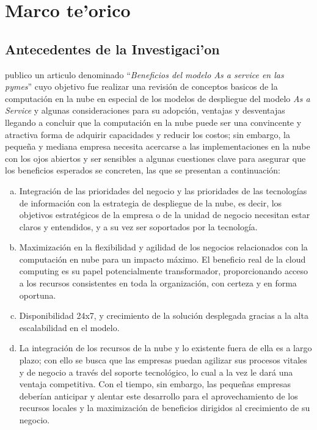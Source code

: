 %
%

\chapter{Marco te'orico}

\section{Antecedentes de la Investigaci'on}
\cite{jrodriguez} publico un articulo denominado ``\emph{Beneficios del modelo As a
service en las pymes}'' cuyo objetivo fue realizar una revisi\'on de conceptos
basicos de la computaci\'on en la nube en especial de los modelos de despliegue
del modelo \emph{As a Service} y algunas consideraciones para su adopci\'on, ventajas
y desventajas llegando a concluir que la computaci\'on en la nube puede ser una
convincente y atractiva forma de adquirir capacidades y reducir los costos; sin
embargo, la peque\~na y mediana empresa necesita acercarse a las implementaciones
en la nube con los ojos abiertos y ser sensibles a algunas cuestiones clave para
asegurar que los beneficios esperados se concreten, las que se presentan a
continuaci\'on:
\begin{enumerate}[a.]
    \item Integraci\'on de las prioridades del negocio y las prioridades de las
          tecnolog\'ias de informaci\'on con la estrategia de despliegue de la
          nube, es decir, los objetivos estrat\'egicos de la empresa o de la
          unidad de negocio necesitan estar claros y entendidos, y a su vez ser
          soportados por la tecnolog\'ia.
    \item Maximizaci\'on en la flexibilidad y agilidad de los negocios
          relacionados con la computaci\'on en nube para un impacto m\'aximo.
          El beneficio real de la cloud computing es su papel potencialmente
          transformador, proporcionando acceso a los recursos consistentes en
          toda la organizaci\'on, con certeza y en forma oportuna.
    \item Disponibilidad 24x7, y crecimiento de la soluci\'on desplegada gracias
          a la alta escalabilidad en el modelo.
    \item La integraci\'on de los recursos de la nube y lo existente fuera de
          ella es a largo plazo; con ello se busca que las empresas puedan agilizar
          sus procesos vitales y de negocio a trav\'es del soporte tecnol\'ogico,
          lo cual a la vez le dar\'a una ventaja competitiva. Con el tiempo, sin
          embargo, las peque\~nas empresas deber\'ian anticipar y alentar este
          desarrollo para el aprovechamiento de los recursos locales y la maximizaci\'on
          de beneficios dirigidos al crecimiento de su negocio.
\end{enumerate}

